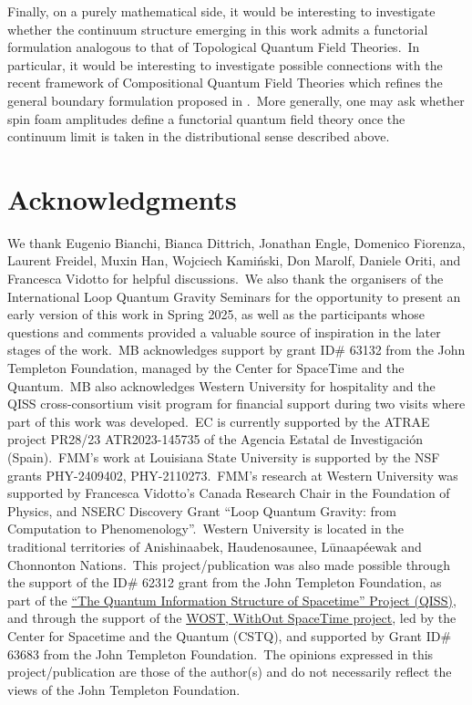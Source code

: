 \documentclass[11pt]{article}
\theoremstyle{definition}
\numberwithin{equation}{section}
\begin{document}
Finally, on a purely mathematical side, it would be interesting to investigate whether the continuum structure emerging in this work admits a functorial formulation analogous to that of Topological Quantum Field Theories.~In particular, it would be interesting to investigate possible connections with the recent framework of Compositional Quantum Field Theories \cite{Oeckl:2022mvg} which refines the general boundary formulation proposed in \cite{Oeckl_2003a}.~More generally, one may ask whether spin foam amplitudes define a functorial quantum field theory once the continuum limit is taken in the distributional sense described above.

\section*{Acknowledgments}

We thank Eugenio Bianchi, Bianca Dittrich, Jonathan Engle, Domenico Fiorenza, Laurent Freidel, Muxin Han, Wojciech Kami\'nski, Don Marolf, Daniele Oriti, and Francesca Vidotto for helpful discussions.~We also thank the organisers of the International Loop Quantum Gravity Seminars for the opportunity to present an early version of this work in Spring 2025, as well as the participants whose questions and comments provided a valuable source of inspiration in the later stages of the work.~MB acknowledges support by grant ID\# 63132 from the John Templeton Foundation, managed by the Center for SpaceTime and the Quantum.~MB also acknowledges Western University for hospitality and the QISS cross-consortium visit program for financial support during two visits where part of this work was developed.~EC is currently supported by the ATRAE project PR28/23 ATR2023-145735 of the Agencia Estatal de Investigación (Spain).~FMM's work at Louisiana State University is supported by the NSF grants PHY-2409402, PHY-2110273.~FMM's research at Western University was supported by Francesca Vidotto’s Canada Research Chair in the Foundation of Physics, and NSERC Discovery Grant ``Loop Quantum Gravity: from Computation to Phenomenology''.~Western University is located in the traditional territories of Anishinaabek, Haudenosaunee, L\=unaap\'eewak and Chonnonton Nations.~This project/publication was also made possible through the support of the ID\# 62312 grant from the John Templeton Foundation, as part of the \href{https://www.templeton.org/grant/the-quantum-information-structure-of-spacetime-qiss-second-phase}{``The Quantum Information Structure of Spacetime'' Project (QISS)}, and through the support of the \href{https://withoutspacetime.org}{WOST, WithOut SpaceTime project}, led by the Center for Spacetime and the Quantum (CSTQ), and supported by Grant ID\# 63683 from the John Templeton Foundation.~The opinions expressed in this project/publication are those of the author(s) and do not necessarily reflect the views of the John Templeton Foundation.
\end{document}
